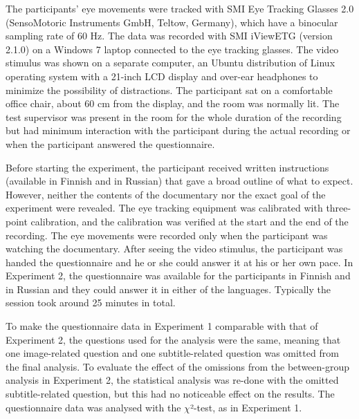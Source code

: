 \documentclass[output=paper]{langsci/langscibook}
\begin{document}
The participants' eye movements were tracked with SMI Eye Tracking Glasses 2.0 (SensoMotoric Instruments GmbH, Teltow, Germany), which have a binocular sampling rate of 60 Hz. The data was recorded with SMI iViewETG (version 2.1.0) on a Windows 7 laptop connected to the eye tracking glasses. The video stimulus was shown on a separate computer, an Ubuntu distribution of Linux operating system with a 21-inch LCD display and over-ear headphones to minimize the possibility of distractions. The participant sat on a comfortable office chair, about 60 cm from the display, and the room was normally lit. The test supervisor was present in the room for the whole duration of the recording but had minimum interaction with the participant during the actual recording or when the participant answered the questionnaire. 

Before starting the experiment, the participant received written instructions (available in Finnish and in Russian) that gave a broad outline of what to expect. However, neither the contents of the documentary nor the exact goal of the experiment were revealed. The eye tracking equipment was calibrated with three-point calibration, and the calibration was verified at the start and the end of the recording. The eye movements were recorded only when the participant was watching the documentary. After seeing the video stimulus, the participant was handed the questionnaire and he or she could answer it at his or her own pace. In Experiment 2, the questionnaire was available for the participants in Finnish and in Russian and they could answer it in either of the languages. Typically the session took around 25 minutes in total.

To make the questionnaire data in Experiment 1 comparable with that of Experiment 2, the questions used for the analysis were the same, meaning that one image-related question and one subtitle-related question was omitted from the final analysis. To evaluate the effect of the omissions from the between-group analysis in Experiment 2, the statistical analysis was re-done with the omitted subtitle-related question, but this had no noticeable effect on the results. The questionnaire data was analysed with the $\chi $²-test, as in Experiment 1.
\end{document}
